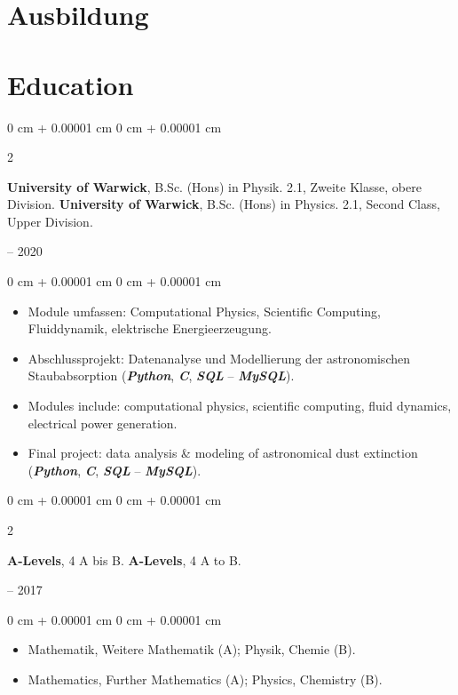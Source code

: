 \documentclass[10pt, letterpaper]{article}
\newenvironment{highlights}{
    \begin{itemize}[
        topsep=0.2 cm,
        parsep=0.2 cm,
        partopsep=0pt,
        itemsep=0.025 cm,
        leftmargin=0 cm + 10pt
    ]
}{
    \end{itemize}
}
\newenvironment{onecolentry}{
    \begin{adjustwidth}{
        0 cm + 0.00001 cm
    }{
        0 cm + 0.00001 cm
    }
}{
    \end{adjustwidth}
}
\newenvironment{twocolentry}[2][]{
    \onecolentry
    \def\secondColumn{#2}
    \setcolumnwidth{\fill, 4.75 cm}
    \begin{paracol}{2}
}{
    \switchcolumn \raggedleft \secondColumn
    \end{paracol}
    \endonecolentry
}
\begin{document}
    \ifdefined\german
    \section{Ausbildung}
    \else
    \section{Education}
    \fi
        \begin{twocolentry}{
            2017 – 2020
        }
            \ifdefined\german
            \textbf{University of Warwick}, B.Sc. (Hons) in Physik. 2.1, Zweite Klasse, obere Division.
            \else
            \textbf{University of Warwick}, B.Sc. (Hons) in Physics. 2.1, Second Class, Upper Division.
            \fi
        \end{twocolentry}

        \vspace{0.10 cm}
        \begin{onecolentry}
            \begin{highlights}
                \ifdefined\german
                \item Module umfassen: Computational Physics, Scientific Computing, Fluiddynamik, elektrische Energieerzeugung.
                \item Abschlussprojekt: Datenanalyse und Modellierung der astronomischen Staubabsorption (\textbf{\textit{Python}}, \textbf{\textit{C}}, \textbf{\textit{SQL}} -- \textbf{\textit{MySQL}}).
                \else
                \item Modules include: computational physics, scientific computing, fluid dynamics, electrical power generation.
                \item Final project: data analysis \& modeling of astronomical dust extinction (\textbf{\textit{Python}}, \textbf{\textit{C}}, \textbf{\textit{SQL}} -- \textbf{\textit{MySQL}}).
                \fi
            \end{highlights}
        \end{onecolentry}
        \vspace{0.20 cm}

        \begin{twocolentry}{
            2015 – 2017
        }
            \ifdefined\german
            \textbf{A-Levels}, 4 A bis B.
            \else
            \textbf{A-Levels}, 4 A to B.
            \fi
        \end{twocolentry}

        \vspace{0.10 cm}
        \begin{onecolentry}
            \begin{highlights}
                \ifdefined\german
                \item Mathematik, Weitere Mathematik (A); Physik, Chemie (B).
                \else
                \item Mathematics, Further Mathematics (A); Physics, Chemistry (B).
                \fi
            \end{highlights}
        \end{onecolentry}
\end{document}
